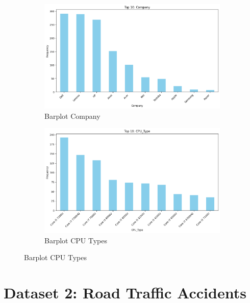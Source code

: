 \documentclass{article}
\begin{document}
\begin{figure}[H]
    \centering
    \begin{subfigure}[b]{0.45\textwidth}
        \centering
        \includegraphics[width=\linewidth]{Barplot_Company.png} 
        \caption{Barplot Company}
        \label{fig:figure1}
    \end{subfigure}
    \hspace{0.05\textwidth} %
    \begin{subfigure}[b]{0.45\textwidth}
        \centering
        \includegraphics[width=\linewidth]{Barplot_CPUTypes.png} 
        \caption{Barplot CPU Types}
        \label{fig:figure2}
    \end{subfigure}
    \label{fig:two_figures}
\end{figure}


\section{Dataset 2: Road Traffic Accidents}
\end{document}
